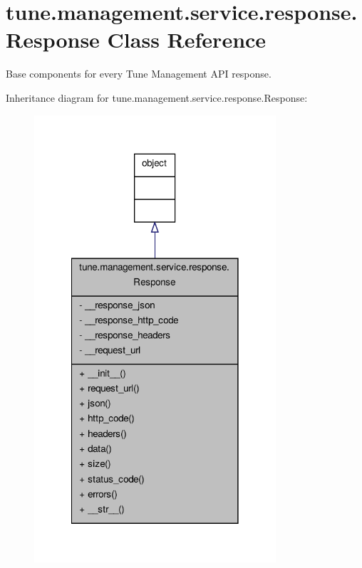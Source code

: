 \hypertarget{classtune_1_1management_1_1service_1_1response_1_1Response}{\section{tune.\-management.\-service.\-response.\-Response Class Reference}
\label{classtune_1_1management_1_1service_1_1response_1_1Response}
}


Base components for every Tune Management A\-P\-I response.  




Inheritance diagram for tune.\-management.\-service.\-response.\-Response\-:
\nopagebreak
\begin{figure}[H]
\begin{center}
\leavevmode
\includegraphics[width=254pt]{classtune_1_1management_1_1service_1_1response_1_1Response__inherit__graph}
\end{center}
\end{figure}



